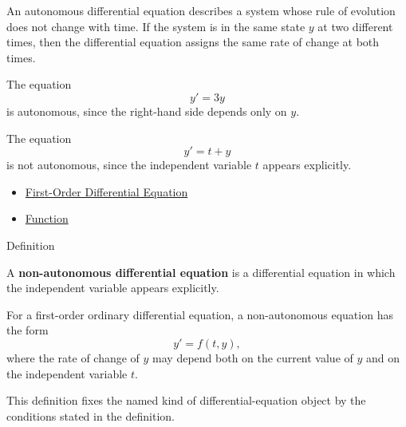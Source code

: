 \begin{remark*}[Interpretation]
An autonomous differential equation describes a system whose rule of evolution does not change with time. If the system is in the same state $y$ at two different times, then the differential equation assigns the same rate of change at both times.
\end{remark*}

\begin{remark*}[Examples]
The equation
\[
y'=3y
\]
is autonomous, since the right-hand side depends only on $y$.

The equation
\[
y'=t+y
\]
is not autonomous, since the independent variable $t$ appears explicitly.
\end{remark*}

\begin{dependencies}
\begin{itemize}
  \item \hyperref[def:ordinary-differential-equations-terminology-first-order-differential-equation]{First-Order Differential Equation}
  \item \hyperref[def:function]{Function}
\end{itemize}
\end{dependencies}


\begin{definitionbox}{Definition}
\begin{definition}
\label{def:ordinary-differential-equations-terminology-non-autonomous-differential-equation}
A \textbf{non-autonomous differential equation} is a differential equation in which the independent variable appears explicitly.

For a first-order ordinary differential equation, a non-autonomous equation has the form
\[
y'=f(t,y),
\]
where the rate of change of $y$ may depend both on the current value of $y$ and on the independent variable $t$.
\end{definition}
\end{definitionbox}

\begin{remark*}
This definition fixes the named kind of differential-equation object by the
conditions stated in the definition.
\end{remark*}

